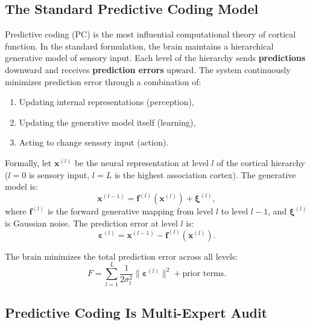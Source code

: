 \documentclass[12pt,a4paper]{article}
\theoremstyle{remark}
\newcommand{\FreeEnergy}{F}
\begin{document}
\subsection{The Standard Predictive Coding Model}

Predictive coding (PC) \cite{rao1999predictive, friston2005theory} is the most
influential computational theory of cortical function. In the standard
formulation, the brain maintains a hierarchical generative model of sensory
input. Each level of the hierarchy sends \textbf{predictions} downward and
receives \textbf{prediction errors} upward. The system continuously minimizes
prediction error through a combination of:
\begin{enumerate}[label=(\roman*)]
    \item Updating internal representations (perception),
    \item Updating the generative model itself (learning),
    \item Acting to change sensory input (action).
\end{enumerate}

Formally, let $\mathbf{x}^{(l)}$ be the neural representation at level $l$
of the cortical hierarchy ($l = 0$ is sensory input, $l = L$ is the highest
association cortex). The generative model is:
\begin{equation}\label{eq:pc-generative}
    \mathbf{x}^{(l-1)} = \mathbf{f}^{(l)}(\mathbf{x}^{(l)}) + \boldsymbol{\xi}^{(l)},
\end{equation}
where $\mathbf{f}^{(l)}$ is the forward generative mapping from level $l$ to
level $l-1$, and $\boldsymbol{\xi}^{(l)}$ is Gaussian noise. The prediction
error at level $l$ is:
\begin{equation}\label{eq:pc-error}
    \boldsymbol{\varepsilon}^{(l)} = \mathbf{x}^{(l-1)} - \mathbf{f}^{(l)}(\mathbf{x}^{(l)}).
\end{equation}

The brain minimizes the total prediction error across all levels:
\begin{equation}\label{eq:pc-objective}
    \FreeEnergy = \sum_{l=1}^{L} \frac{1}{2\sigma_l^2} \|\boldsymbol{\varepsilon}^{(l)}\|^2 + \text{prior terms}.
\end{equation}

\subsection{Predictive Coding Is Multi-Expert Audit}
\end{document}
